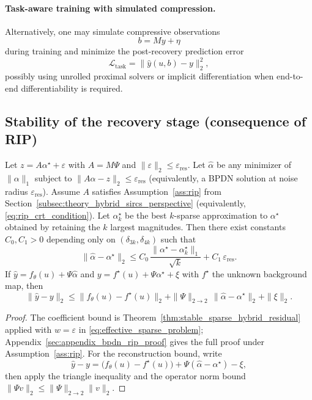 \paragraph{Task-aware training with simulated compression.}
Alternatively, one may simulate compressive observations
\[
  b = My + \eta
\]
during training and minimize the post-recovery prediction error
\begin{equation}
  \mathcal{L}_{\mathrm{task}}
  =
  \|\hat{y}(u,b) - y\|_2^2,
\end{equation}
possibly using unrolled proximal solvers or implicit differentiation when end-to-end differentiability is required.

\subsection{Stability of the recovery stage (consequence of RIP)}
\begin{proposition}
\label{prop:method_recovery_stability}
Let $z=A\alpha^\star+\varepsilon$ with $A=M\Psi$ and $\|\varepsilon\|_2\le \varepsilon_{\mathrm{res}}$.
Let $\widehat{\alpha}$ be any minimizer of $\|\alpha\|_1$ subject to $\|A\alpha-z\|_2\le \varepsilon_{\mathrm{res}}$ (equivalently, a BPDN solution at noise radius $\varepsilon_{\mathrm{res}}$).
Assume $A$ satisfies Assumption~\ref{ass:rip} from Section~\ref{subsec:theory_hybrid_sircs_perspective} (equivalently, \eqref{eq:rip_crt_condition}).
Let $\alpha^\star_k$ be the best $k$-sparse approximation to $\alpha^\star$ obtained by retaining the $k$ largest magnitudes.
Then there exist constants $C_0,C_1>0$ depending only on $(\delta_{3k},\delta_{4k})$ such that
\begin{equation}
  \|\widehat{\alpha}-\alpha^\star\|_2
  \le
  C_0\,\frac{\|\alpha^\star-\alpha^\star_k\|_1}{\sqrt{k}}
  +
  C_1\,\varepsilon_{\mathrm{res}}.
\end{equation}
If $\widehat{y}=f_\theta(u)+\Psi\widehat{\alpha}$ and $y=f^\star(u)+\Psi\alpha^\star+\xi$ with $f^\star$ the unknown background map, then
\begin{equation}
  \|\widehat{y}-y\|_2
  \le
  \|f_\theta(u)-f^\star(u)\|_2 + \|\Psi\|_{2\to 2}\,\|\widehat{\alpha}-\alpha^\star\|_2 + \|\xi\|_2.
\end{equation}
\end{proposition}

\begin{proof}
The coefficient bound is Theorem~\ref{thm:stable_sparse_hybrid_residual} applied with $w=\varepsilon$ in \eqref{eq:effective_sparse_problem}; Appendix~\ref{sec:appendix_bpdn_rip_proof} gives the full proof under Assumption~\ref{ass:rip}.
For the reconstruction bound, write
\[
  \widehat{y}-y
  =
  \bigl(f_\theta(u)-f^\star(u)\bigr) + \Psi(\widehat{\alpha}-\alpha^\star) - \xi,
\]
then apply the triangle inequality and the operator norm bound $\|\Psi v\|_2\le \|\Psi\|_{2\to 2}\|v\|_2$.
\end{proof}

